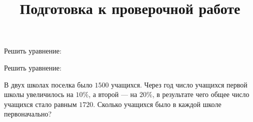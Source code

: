 \begin{class}[number=5]
\begin{listofex}[resume]
\begin{enumcols}[itemcolumns=2]
			\item {}
			\item {}
			\item {}
		\end{enumcols}
		\item Решить уравнение:
		\begin{enumcols}[itemcolumns=1]
			\item {}
			\item {}
			\item {}
			\item {}
		\end{enumcols}
		\item Решить уравнение:
		\begin{enumcols}[itemcolumns=2]
			\item {}
			\item {}
		\end{enumcols}
		\item В двух школах поселка было \( 1500 \) учащихся. Через год число учащихся первой
		школы увеличилось на \( 10\% \), а второй --- на \( 20\% \), в результате чего общее число учащихся стало равным \( 1720 \). Сколько учащихся было в каждой школе первоначально?
	\end{listofex}
\end{class}
%
%
%	
%
%
%
%
%
\newpage
\title{Подготовка к проверочной работе}
